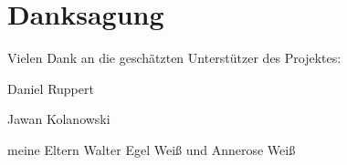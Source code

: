 \chapter*{Danksagung}
Vielen Dank an die geschätzten Unterstützer des Projektes:

Daniel Ruppert

Jawan Kolanowski

meine Eltern Walter Egel Weiß und Annerose Weiß